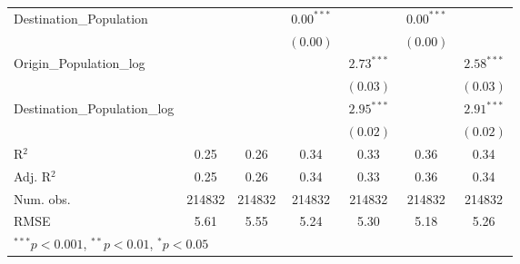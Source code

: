 \begin{table}
\begin{center}
\begin{tabular}{l c c c c c c }
			Destination\_Population      &               &               & $0.00^{***}$  &                & $0.00^{***}$  &                \\
			&               &               & $(0.00)$      &                & $(0.00)$      &                \\
			Origin\_Population\_log      &               &               &               & $2.73^{***}$   &               & $2.58^{***}$   \\
			&               &               &               & $(0.03)$       &               & $(0.03)$       \\
			Destination\_Population\_log &               &               &               & $2.95^{***}$   &               & $2.91^{***}$   \\
			&               &               &               & $(0.02)$       &               & $(0.02)$       \\
			\hline
			R$^2$                        & 0.25          & 0.26          & 0.34          & 0.33           & 0.36          & 0.34           \\
			Adj. R$^2$                   & 0.25          & 0.26          & 0.34          & 0.33           & 0.36          & 0.34           \\
			Num. obs.                    & 214832        & 214832        & 214832        & 214832         & 214832        & 214832         \\
			RMSE                         & 5.61          & 5.55          & 5.24          & 5.30           & 5.18          & 5.26           \\
			\hline
			\multicolumn{7}{l}{\scriptsize{$^{***}p<0.001$, $^{**}p<0.01$, $^*p<0.05$}}
		\end{tabular}
		\label{table:GravityModel2017Q2}
	\end{center}
\end{table}



